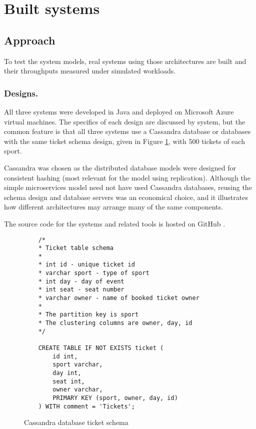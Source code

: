 %
%

\section{Built systems}\label{sec:built-systems}

\subsection{Approach}

To test the system models, real systems using those architectures are built and their throughputs measured under simulated workloads.

\subsubsection{Designs.}  All three systems were developed in Java and deployed on Microsoft Azure virtual machines.  The specifics of each design are discussed by system, but the common feature is that all three systems use a Cassandra database or databases with the same ticket schema design, given in Figure \ref{figure:cassandra_ticket_schema}, with 500 tickets of each sport.

Cassandra was chosen as the distributed database models were designed for consistent hashing (most relevant for the model using replication).  Although the simple microservices model need not have used Cassandra databases, reusing the schema design and database servers was an economical choice, and it illustrates how different architectures may arrange many of the same components.

The source code for the systems and related tools is hosted on GitHub \cite{RN1073}.

\begin{figure}
	\caption{Cassandra database ticket schema}
	\label{figure:cassandra_ticket_schema}
	\centering
	\begin{lstlisting}
	/*
	* Ticket table schema
	* 
	* int id - unique ticket id
	* varchar sport - type of sport
	* int day - day of event
	* int seat - seat number
	* varchar owner - name of booked ticket owner
	* 
	* The partition key is sport
	* The clustering columns are owner, day, id
	*/
	
	CREATE TABLE IF NOT EXISTS ticket (
		id int,
		sport varchar,
		day int,
		seat int,
		owner varchar,
		PRIMARY KEY (sport, owner, day, id)
	) WITH comment = 'Tickets';
	\end{lstlisting}
\end{figure}

